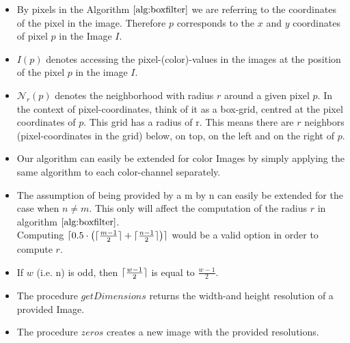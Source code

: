 \documentclass{paper}
\DeclarePairedDelimiter\ceil{\lceil}{\rceil}
\begin{document}
\begin{itemize}
    \item By pixels in the Algorithm $\ref{alg:boxfilter}$ we are referring to the coordinates of the pixel in the image. Therefore $p$ corresponds to the $x$ and $y$ coordinates of pixel $p$ in the Image $I$.
    \item $I(p)$ denotes accessing the pixel-(color)-values in the images at the position of the pixel $p$ in the image $I$.
    \item $\mathcal{N}_r(p)$ denotes the neighborhood with radius $r$ around a given pixel $p$. In the context of pixel-coordinates, think of it as a box-grid, centred at the pixel coordinates of $p$. This grid has a radius of r. This means there are $r$ neighbors (pixel-coordinates in the grid) below, on top, on the left and on the right of $p$.
    \item Our algorithm can easily be extended for color Images by simply applying the same algorithm to each color-channel separately.
    \item The assumption of being provided by a m by n can easily be extended for the case when $n \neq m$. This only will affect the computation of the radius $r$ in algorithm $\ref{alg:boxfilter}$. \\ Computing $\ceil{0.5 \cdot \left( \ceil{\frac{m-1}{2}} + \ceil{\frac{n-1}{2}}\right)}$ would be a valid option in order to compute $r$. 
    \item If $w$ (i.e. n) is odd, then $\ceil{\frac{w-1}{2}}$ is equal to $\frac{w-1}{2}$. 
    \item The procedure $getDimensions$ returns the width-and height resolution of a provided Image.
    \item The procedure $zeros$ creates a new image with the provided resolutions.
\end{itemize}
\end{document}
